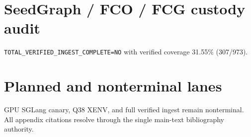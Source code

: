 \section{SeedGraph / FCO / FCG custody audit}
\label{app:seedgraph}
\texttt{TOTAL\_VERIFIED\_INGEST\_COMPLETE=NO} with verified coverage 31.55\% (307/973).

\section{Planned and nonterminal lanes}
\label{app:planned}
GPU SGLang canary, Q38 XENV, and full verified ingest remain nonterminal.
All appendix citations resolve through the single main-text bibliography authority.

